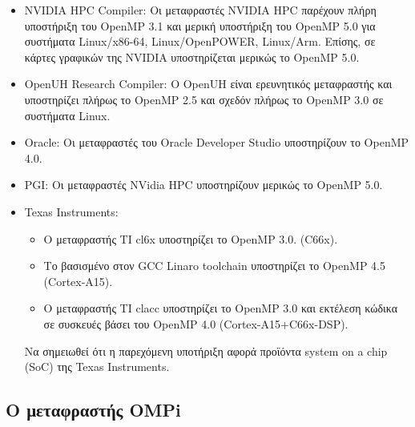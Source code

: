 \begin{itemize}
	\item NVIDIA HPC Compiler: Οι μεταφραστές NVIDIA HPC παρέχουν πλήρη υποστήριξη του OpenMP 3.1 και μερική υποστήριξη του OpenMP 5.0 για συστήματα Linux/x86-64, Linux/OpenPOWER, Linux/Arm. Επίσης, σε κάρτες γραφικών της NVIDIA υποστηρίζεται μερικώς το OpenMP 5.0.
	\item OpenUH Research Compiler: Ο OpenUH είναι ερευνητικός μεταφραστής και υποστηρίζει πλήρως το OpenMP 2.5 και σχεδόν πλήρως το OpenMP 3.0 σε συστήματα Linux.
	\item Oracle: Οι μεταφραστές του Oracle Developer Studio υποστηρίζουν το OpenMP 4.0.
	\item PGI: Οι μεταφραστές NVidia HPC υποστηρίζουν μερικώς το OpenMP 5.0.
	\item Texas Instruments:
		\begin{itemize}
			\item Ο μεταφραστής TI cl6x υποστηρίζει το OpenMP 3.0. (C66x).
			\item Το βασισμένο στον GCC Linaro toolchain υποστηρίζει το OpenMP 4.5 (Cortex-A15).
			\item Ο μεταφραστής TI clacc υποστηρίζει το OpenMP 3.0 και εκτέλεση κώδικα σε συσκευές βάσει του OpenMP 4.0 (Cortex-A15+C66x-DSP).
		\end{itemize}
		Να σημειωθεί ότι η παρεχόμενη υποτήριξη αφορά προϊόντα system on a chip (SoC) της Texas Instruments.
\end{itemize}

\subsection{Ο μεταφραστής OMPi}

